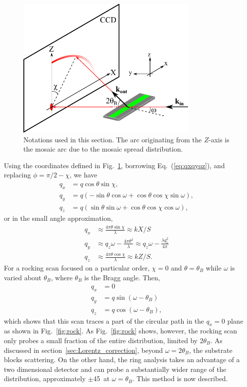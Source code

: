 \begin{figure}
  \centering
  \includegraphics[width=0.8\textwidth]{figures/ripple/mosaic/ring_setup}
  \caption{Notations used in this section. The arc originating from the $Z$-axis
  is the mosaic arc due to the mosaic spread distribution.}
  \label{fig:ring_setup}
\end{figure}


Using the coordinates defined in Fig.~\ref{fig:ring_setup},
borrowing Eq.~(\ref{eq:qxqyqz}), and replacing $\phi=\pi/2-\chi$,
we have
\begin{align}
  q_x &= q\cos\theta\sin\chi, \nonumber\\
  q_y &= q\left(-\sin\theta\cos\omega + \cos\theta\cos\chi\sin\omega\right), \nonumber\\
  q_z &= q\left(\sin\theta\sin\omega + \cos\theta\cos\chi\cos\omega\right),
  \label{eq:ccd2q}
\end{align}
or in the small angle approximation,
\begin{align}
  q_x &\approx \frac{4\pi\theta\sin\chi}{\lambda} \approx kX/S \nonumber\\
  q_y &\approx q_z\omega -\frac{4\pi\theta^2}{\lambda} \approx q_z\omega - \frac{\lambda q_z^2}{4\pi}\nonumber\\
  q_z &\approx \frac{4\pi\theta\cos\chi}{\lambda} \approx kZ/S.
  \label{eq:ccd2q_small}
\end{align}
For a rocking scan focused on a particular order, 
$\chi=0$ and $\theta=\theta_B$ while $\omega$ is varied about $\theta_B$, 
where $\theta_B$ is the Bragg angle. Then, 
\begin{align}
  q_x &= 0 \nonumber\\
  q_y &= q\sin(\omega-\theta_B) \nonumber\\
  q_z &= q\cos(\omega-\theta_B),
  \label{eq:rock} 
\end{align}
which shows that this scan traces a part of the circular path in the $q_x=0$ plane
as shown in Fig.~\ref{fig:rock}. As Fig.~\ref{fig:rock} shows, however, the 
rocking scan only probes a small fraction of the entire distribution, limited
by $2\theta_B$. As discussed in section~\ref{sec:Lorentz_correction}, beyond
$\omega=2\theta_B$, the substrate blocks scattering. On the other hand,
the ring analysis takes an advantage of a two dimensional detector and can probe
a substantially wider range of the distribution, approximately $\pm$45\textdegree\
at $\omega=\theta_B$. This method is now described.

